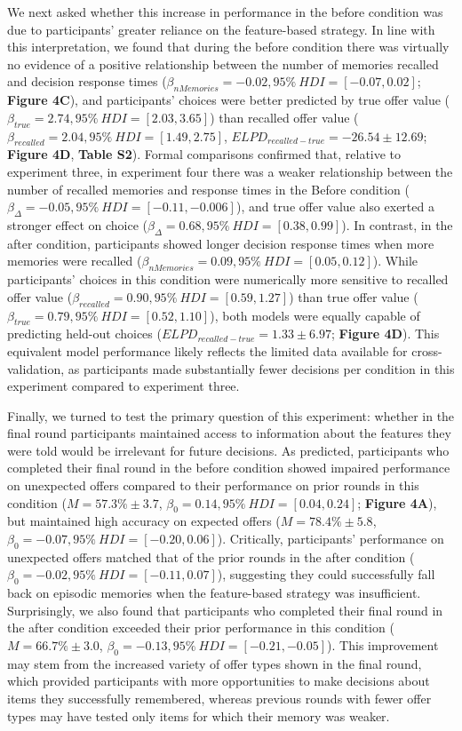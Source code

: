 \documentclass[10pt,letterpaper]{article}
\begin{document}
We next asked whether this increase in performance in the before condition was due to participants' greater reliance on the feature-based strategy. In line with this interpretation, we found that during the before condition there was virtually no evidence of a positive relationship between the number of memories recalled and decision response times ($\beta_{nMemories} = -0.02, 95\% \ HDI = [-0.07, 0.02]$; \textbf{Figure 4C}), and participants' choices were better predicted by true offer value ($\beta_{true} = 2.74, 95\% \ HDI = [2.03, 3.65]$) than recalled offer value ($\beta_{recalled} = 2.04, 95\% \ HDI = [1.49, 2.75]$, $ELPD_{recalled-true} = -26.54 \pm 12.69$; \textbf{Figure 4D}, \textbf{Table S2}). Formal comparisons confirmed that, relative to experiment three, in experiment four there was a weaker relationship between the number of recalled memories and response times in the Before condition ($\beta_{\Delta} = -0.05, 95\% \ HDI = [-0.11, -0.006]$), and true offer value also exerted a stronger effect on choice ($\beta_{\Delta} = 0.68, 95\% \ HDI = [0.38, 0.99]$). In contrast, in the after condition, participants showed longer decision response times when more memories were recalled ($\beta_{nMemories} = 0.09, 95\% \ HDI = [0.05, 0.12]$). While participants' choices in this condition were numerically more sensitive to recalled offer value ($\beta_{recalled} = 0.90, 95\% \ HDI = [0.59, 1.27]$) than true offer value ($\beta_{true} = 0.79, 95\% \ HDI = [0.52, 1.10]$), both models were equally capable of predicting held-out choices ($ELPD_{recalled-true} = 1.33 \pm 6.97$; \textbf{Figure 4D}). This equivalent model performance likely reflects the limited data available for cross-validation, as participants made substantially fewer decisions per condition in this experiment compared to experiment three.

Finally, we turned to test the primary question of this experiment: whether in the final round participants maintained access to information about the features they were told would be irrelevant for future decisions. As predicted, participants who completed their final round in the before condition showed impaired performance on unexpected offers compared to their performance on prior rounds in this condition ($M = 57.3\% \pm 3.7$, $\beta_{0} = 0.14, 95\% \ HDI = [0.04, 0.24]$; \textbf{Figure 4A}), but maintained high accuracy on expected offers ($M = 78.4\% \pm 5.8$, $\beta_{0} = -0.07, 95\% \ HDI = [-0.20, 0.06]$). Critically, participants' performance on unexpected offers matched that of the prior rounds in the after condition ($\beta_{0} = -0.02, 95\% \ HDI = [-0.11, 0.07]$), suggesting they could successfully fall back on episodic memories when the feature-based strategy was insufficient. Surprisingly, we also found that participants who completed their final round in the after condition exceeded their prior performance in this condition ($M = 66.7\% \pm 3.0$, $\beta_{0} = -0.13,  95\% \ HDI = [-0.21, -0.05]$). This improvement may stem from the increased variety of offer types shown in the final round, which provided participants with more opportunities to make decisions about items they successfully remembered, whereas previous rounds with fewer offer types may have tested only items for which their memory was weaker.
\end{document}
